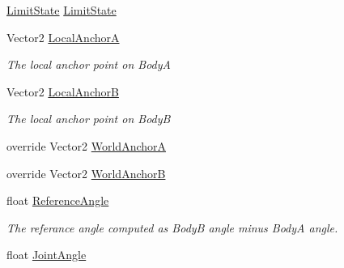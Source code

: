 \begin{DoxyCompactItemize}
\item 
\hyperlink{namespace_farseer_physics_1_1_dynamics_1_1_joints_a31a093d39ac5f01671837f083d915a35}{Limit\+State} \hyperlink{class_farseer_physics_1_1_dynamics_1_1_joints_1_1_revolute_joint_acc7c3866ba3b0fe5c9f418934e7de6ee}{Limit\+State}
\item 
Vector2 \hyperlink{class_farseer_physics_1_1_dynamics_1_1_joints_1_1_revolute_joint_a71a968de06a14313950d7e0c19ace6f3}{Local\+Anchor\+A}
\begin{DoxyCompactList}\small\item\em The local anchor point on Body\+A \end{DoxyCompactList}\item 
Vector2 \hyperlink{class_farseer_physics_1_1_dynamics_1_1_joints_1_1_revolute_joint_a365c567f4fc2af1277a1341e0024b62c}{Local\+Anchor\+B}
\begin{DoxyCompactList}\small\item\em The local anchor point on Body\+B \end{DoxyCompactList}\item 
override Vector2 \hyperlink{class_farseer_physics_1_1_dynamics_1_1_joints_1_1_revolute_joint_abca3c0a8d61cf8aff63898df838b4fa4}{World\+Anchor\+A}
\item 
override Vector2 \hyperlink{class_farseer_physics_1_1_dynamics_1_1_joints_1_1_revolute_joint_a9f0de7928e71ca6fdd5dc8b7eef2ab9c}{World\+Anchor\+B}
\item 
float \hyperlink{class_farseer_physics_1_1_dynamics_1_1_joints_1_1_revolute_joint_af3ec8195281b5fa8b9afa2b8017826e6}{Reference\+Angle}
\begin{DoxyCompactList}\small\item\em The referance angle computed as Body\+B angle minus Body\+A angle. \end{DoxyCompactList}\item 
float \hyperlink{class_farseer_physics_1_1_dynamics_1_1_joints_1_1_revolute_joint_a1b25358b2a05bf4c41f2d9811188b836}{Joint\+Angle}

\end{DoxyCompactItemize}
